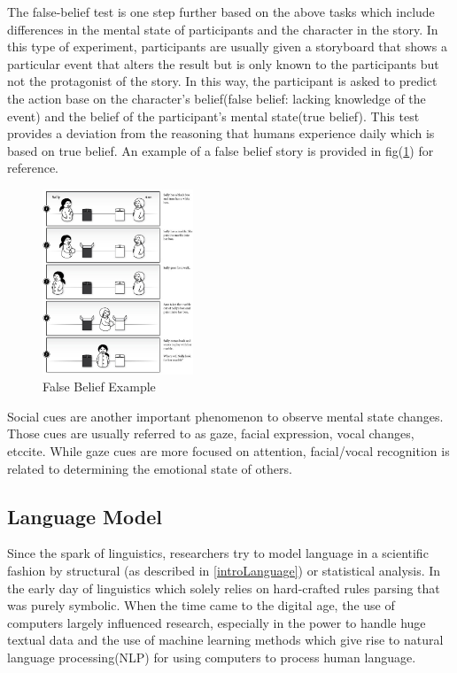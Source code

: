 \documentclass[12pt]{article}
\begin{document}
The false-belief test is one step further based on the above tasks which include differences in the mental state of participants and the character in the story\cite{Byom_2013}. In this type of experiment, participants are usually given a storyboard that shows a particular event that alters the result but is only known to the participants but not the protagonist of the story. In this way, the participant is asked to predict the action base on the character's belief(false belief: lacking knowledge of the event) and the belief of the participant's mental state(true belief). This test provides a deviation from the reasoning that humans experience daily which is based on true belief\cite{Byom_2013}. An example of a false belief story is provided in fig(\ref{fig:falseBelief}) for reference.
\newpage

\begin{figure} [!h]
\begin{center}
\includegraphics[width=0.4\textwidth]{figures/false_belief_story.jpg}
\caption{False Belief Example \cite{Wimmer_1983}}
\label{fig:falseBelief}
\end{center}
\end{figure}
Social cues are another important phenomenon to observe mental state changes. Those cues are usually referred to as gaze, facial expression, vocal changes, etc{cite}. While gaze cues are more focused on attention, facial/vocal recognition is related to determining the emotional state of others. 



\subsection{Language Model} \label{introLM}
Since the spark of linguistics, researchers try to model language in a scientific fashion by structural (as described in \ref{introLanguage}) or statistical analysis. In the early day of linguistics which solely relies on hard-crafted rules parsing that was purely symbolic\cite{Nadkarni_2011}. When the time came to the digital age, the use of computers largely influenced research, especially in the power to handle huge textual data and the use of machine learning methods which give rise to natural language processing(NLP) for using computers to process human language.
\end{document}
